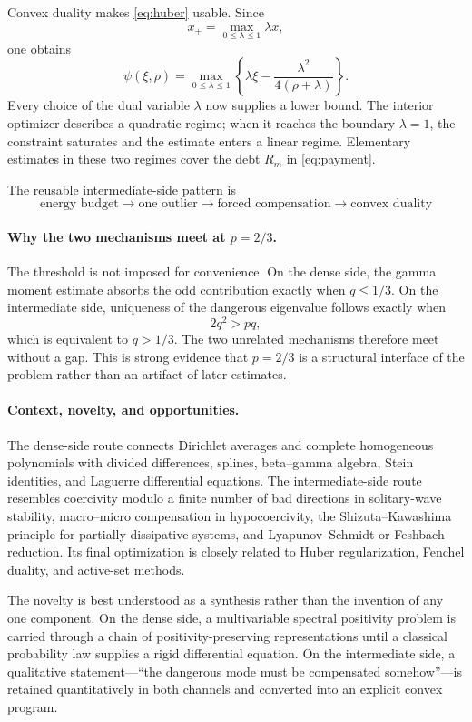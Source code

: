 \documentclass[10pt]{article}
\begin{document}
Convex duality makes \eqref{eq:huber} usable.  Since
\[
  x_+=\max_{0\le\lambda\le1}\lambda x,
\]
one obtains
\begin{equation}\label{eq:dual}
  \psi(\xi,\rho)
  =\max_{0\le\lambda\le1}
  \left\{
    \lambda\xi-\frac{\lambda^2}{4(\rho+\lambda)}
  \right\}.
\end{equation}
Every choice of the dual variable $\lambda$ now supplies a lower bound.  The interior optimizer describes a quadratic regime; when it reaches the boundary $\lambda=1$, the constraint saturates and the estimate enters a linear regime.  Elementary estimates in these two regimes cover the debt $R_m$ in \eqref{eq:payment}.

The reusable intermediate-side pattern is
\[
  \boxed{
    \text{energy budget}
    \to\text{one outlier}
    \to\text{forced compensation}
    \to\text{convex duality}}
\]

\paragraph{Why the two mechanisms meet at $p=2/3$.}
The threshold is not imposed for convenience.  On the dense side, the gamma moment estimate absorbs the odd contribution exactly when $q\le1/3$.  On the intermediate side, uniqueness of the dangerous eigenvalue follows exactly when
\[
  2q^2>pq,
\]
which is equivalent to $q>1/3$.  The two unrelated mechanisms therefore meet without a gap.  This is strong evidence that $p=2/3$ is a structural interface of the problem rather than an artifact of later estimates.

\paragraph{Context, novelty, and opportunities.}
The dense-side route connects Dirichlet averages and complete homogeneous polynomials with divided differences, splines, beta--gamma algebra, Stein identities, and Laguerre differential equations.  The intermediate-side route resembles coercivity modulo a finite number of bad directions in solitary-wave stability, macro--micro compensation in hypocoercivity, the Shizuta--Kawashima principle for partially dissipative systems, and Lyapunov--Schmidt or Feshbach reduction.  Its final optimization is closely related to Huber regularization, Fenchel duality, and active-set methods.

The novelty is best understood as a synthesis rather than the invention of any one component.  On the dense side, a multivariable spectral positivity problem is carried through a chain of positivity-preserving representations until a classical probability law supplies a rigid differential equation.  On the intermediate side, a qualitative statement---``the dangerous mode must be compensated somehow''---is retained quantitatively in both channels and converted into an explicit convex program.
\end{document}
